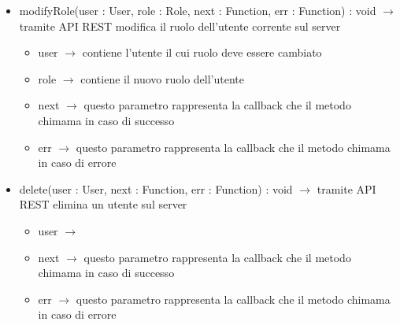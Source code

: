 \begin{description}
\begin{itemize}
	\item modifyRole(user : User, role : Role, next : Function, err : Function) : void $\rightarrow$ tramite API REST modifica il ruolo dell'utente corrente sul server\begin{itemize}
		\item user $\rightarrow$ contiene l'utente il cui ruolo deve essere cambiato
		\item role $\rightarrow$ contiene il nuovo ruolo dell'utente
		\item next $\rightarrow$ questo parametro rappresenta la callback che il metodo chimama in caso di successo
		\item err $\rightarrow$ questo parametro rappresenta la callback che il metodo chimama in caso di errore
	\end{itemize}
	
	\item delete(user : User, next : Function, err : Function) : void $\rightarrow$ tramite API REST elimina un utente sul server\begin{itemize}
		\item user $\rightarrow$ 
		\item next $\rightarrow$ questo parametro rappresenta la callback che il metodo chimama in caso di successo
		\item err $\rightarrow$ questo parametro rappresenta la callback che il metodo chimama in caso di errore
	\end{itemize}
	
\end{itemize}

\end{description}

